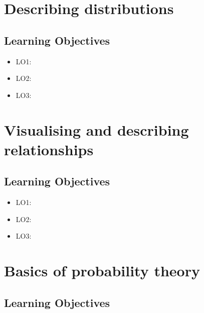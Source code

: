 \documentclass[12pt,]{krantz}
\providecommand{\tightlist}{%
  \setlength{\itemsep}{0pt}\setlength{\parskip}{0pt}}
\begin{document}
\hypertarget{chap-describing-distributions}{%
\section{Describing distributions}\label{chap-describing-distributions}}

\hypertarget{learning-objectives-3}{%
\subsection*{Learning Objectives}\label{learning-objectives-3}}

\begin{itemize}
\tightlist
\item
  LO1:
\item
  LO2:
\item
  LO3:
\end{itemize}

\hypertarget{chap-relationships}{%
\section{Visualising and describing relationships}\label{chap-relationships}}

\hypertarget{learning-objectives-4}{%
\subsection*{Learning Objectives}\label{learning-objectives-4}}

\begin{itemize}
\tightlist
\item
  LO1:
\item
  LO2:
\item
  LO3:
\end{itemize}

\hypertarget{chap-probability-theory}{%
\section{Basics of probability theory}\label{chap-probability-theory}}

\hypertarget{learning-objectives-5}{%
\subsection*{Learning Objectives}\label{learning-objectives-5}}
\end{document}
